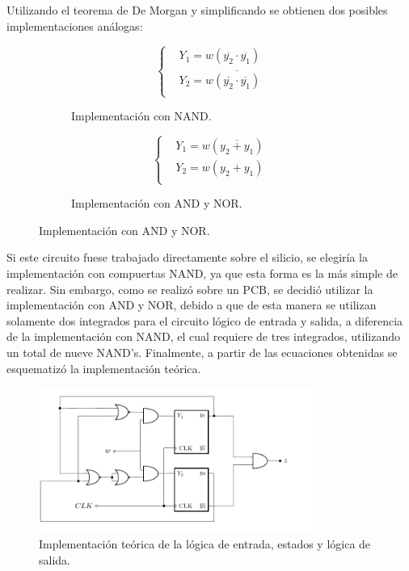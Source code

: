 Utilizando el teorema de De Morgan y simplificando se obtienen dos posibles implementaciones análogas:
\begin{figure}[H]
\begin{subfigure}{0.49\textwidth}
\vspace*{-0.17cm}
\begin{equation*}
\left\{
\begin{aligned}
		& Y_1 = w(\overline{y_2}\cdot \overline{y_1})	 \\		
		& Y_2 = w\overline{(\overline{y_2}\cdot \overline{y_1})}\\		
\end{aligned}
\right.
\end{equation*}
\caption{Implementación con NAND.}
\end{subfigure}
\begin{subfigure}{0.49\textwidth}
\begin{equation*}
\left\{
\begin{aligned}
		& Y_1 = w(\overline{y_2+y_1}) \\		
		& Y_2 = w(y_2+y_1)\\		
\end{aligned}
\right.
\end{equation*}
\caption{Implementación con AND y NOR.}
\end{subfigure}
\end{figure}

Si este circuito fuese trabajado directamente sobre el silicio, se elegiría la implementación con compuertas NAND, ya que esta forma es la más simple de realizar. Sin embargo, como se realizó sobre un PCB, se decidió utilizar la implementación con AND y NOR, debido a que de esta manera se utilizan solamente dos integrados para el circuito lógico de entrada y salida, a diferencia de la implementación con NAND, el cual requiere de tres integrados, utilizando un total de nueve NAND's. Finalmente, a partir de las ecuaciones obtenidas se esquematizó la implementación teórica.

\begin{figure}[H]
	\centering
	\includegraphics[width=0.8\textwidth, page=1]{ImagenesEjercicio3/Maquina.pdf}
	\caption{Implementación teórica de la lógica de entrada, estados y lógica de salida.}
\end{figure}


